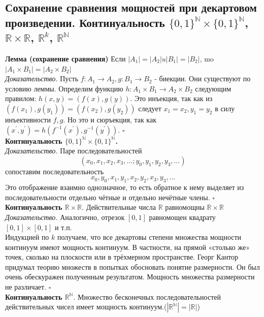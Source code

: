 \documentclass[a4paper]{article}
\newcommand{\qed}{\hfill$\square$}
\begin{document}
\subsection{Сохранение сравнения мощностей при декартовом произведении. Континуальность $\{0,1\}^{\mathbb{N}}\times\{0,1\}^{\mathbb{N}}$, $\mathbb{R}\times\mathbb{R}$, $\mathbb{R}^k$, $\mathbb{R}^{\mathbb{N}}$}
\textbf{Лемма (сохранение сравнения)} Если $\left|A_{1}\right|=\left|A_{2}\right| u\left|B_{1}\right|=\left|B_{2}\right|$, mo $\left|A_{1} \times B_{1}\right|=\left|A_{2} \times B_{2}\right|$\\[2mm]
\textit{Доказательство.} Пусть $f: A_{1} \rightarrow A_{2}, g: B_{1} \rightarrow B_{2}$ - биекции. Они существуют по условию леммы. Определим функцию $h: A_{1} \times B_{1} \rightarrow A_{2} \times B_{2}$ следующим правилом: $h(x, y)=(f(x), g(y))$. Это инъекция, так как из $\left(f\left(x_{1}\right), g\left(y_{1}\right)\right)=\left(f\left(x_{2}\right), g\left(y_{2}\right)\right)$ следует $x_{1}=x_{2}, y_{1}=y_{2}$ в силу инъективности $f, g$. Но это и сюръекция, так как $\left(x^{\prime}, y^{\prime}\right)=h\left(f^{-1}\left(x^{\prime}\right), g^{-1}\left(y^{\prime}\right)\right)$. \qed\\[2mm]
\textbf{Континуальность $\{0,1\}^{\mathbb{N}}\times\{0,1\}^{\mathbb{N}}$.}\\[2mm]
\textit{Доказательство.} Паре последовательностей
$$\left(x_{0}, x_{1}, x_{2}, x_{3}, \ldots ; y_{0}, y_{1}, y_{2}, y_{3}, \ldots\right)$$
сопоставим последовательность
$$
x_{0}, y_{0}, x_{1}, y_{1}, x_{2}, y_{2}, x_{3}, y_{3}, \ldots
$$
\indent Это отображение взаимно однозначное, то есть обратное к нему выделяет из последовательности отдельно чётные и отдельно нечётные члены. \qed\\[2mm]
\label{sec:2.36}\textbf{Континуальность $\mathbb{R}\times\mathbb{R}$}. Действительные числа $\mathbb{R}$ равномощны $\mathbb{R} \times \mathbb{R}$\\[2mm]
\textit{Доказательство.} Аналогично, отрезок $[0,1]$ равномощен квадрату $[0,1] \times[0,1]$ и т.п.\\[2mm]
\indent Индукцией по $k$ получаем, что все декартовы степени множества мощности континуум имеют мощность континуум. В частности, на прямой «столько же» точек, сколько на плоскости или в трёхмерном пространстве. Георг Кантор придумал теорию множеств в попытках обосновать понятие размерности. Он был очень обескуражен полученным результатом. Мощность множества размерности не различает. \qed\\[2mm]
\textbf{Континуальность $\mathbb{R}^{\mathbb{N}}$}. Множество бесконечных последовательностей действительных чисел имеет мощность континуум.($\left|\mathbb{R}^{\mathbb{N}}\right|=|\mathbb{R}|$)\\[2mm]
\end{document}
